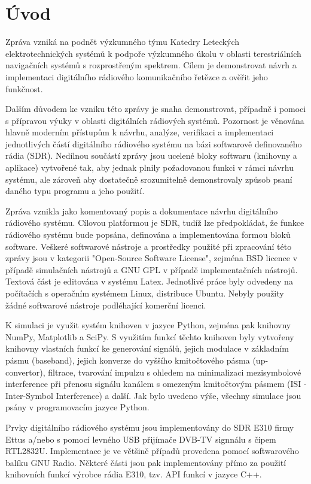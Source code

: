 \section{Úvod}


\marginpar{\textcolor{txt_blue}{Hlavní cíl zprávy}} 
Zpráva vzniká na podnět výzkumného týmu Katedry Leteckých elektrotechnických systémů k podpoře výzkumného úkolu v oblasti terestriálních navigačních systémů s rozprostřeným spektrem. Cílem je demonstrovat návrh a implementaci digitálního rádiového komunikačního řetězce a ověřit jeho funkčnost.

\marginpar{\textcolor{txt_blue}{Sekundární cíl zprávy}} 
Dalším důvodem ke vzniku této zprávy je snaha demonstrovat, případně i pomoci s přípravou výuky v oblasti digitálních rádiových systémů. Pozornost je věnována hlavně moderním přístupům k návrhu, analýze, verifikaci a implementaci jednotlivých částí digitálního rádiového systému na bázi softwarově definovaného rádia (SDR). Nedílnou součástí zprávy jsou ucelené bloky softwaru (knihovny a aplikace) vytvořené tak, aby jednak plnily požadovanou funkci v rámci návrhu systému, ale zároveň aby dostatečně srozumitelně demonstrovaly způsob psaní daného typu programu a jeho použití. 

\marginpar{\textcolor{txt_blue}{Použité prostředky}} 
Zpráva vznikla jako komentovaný popis a dokumentace návrhu digitálního rádiového systému. Cílovou platformou je SDR, tudíž lze předpokládat, že funkce rádiového systému bude popsána, definována a implementována formou bloků software. Veškeré softwarové nástroje a prostředky použité při zpracování této zprávy jsou v kategorii "Open-Source Software License", zejména BSD licence v případě simulačních nástrojů a GNU GPL v případě implementačních nástrojů. Textová část je editována v systému Latex. Jednotlivé práce byly odvedeny na počítačích s operačním systémem Linux, distribuce Ubuntu. Nebyly použity žádné softwarové nástroje podléhající komerční licenci.

K simulaci je využit systém knihoven v jazyce Python, zejména pak knihovny NumPy, Matplotlib a SciPy. S využitím funkcí těchto knihoven byly vytvořeny knihovny vlastních funkcí ke generování signálů, jejich modulace v základním pásmu (baseband), jejich konverze do vyššího kmitočtového pásma (up-convertor), filtrace, tvarování impulzu s ohledem na minimalizaci mezisymbolové interference při přenosu signálu kanálem s omezeným kmitočtovým pásmem (ISI - Inter-Symbol Interference) a další. Jak bylo uvedeno výše, všechny simulace jsou psány v programovacím jazyce Python.

Prvky digitálního rádiového systému jsou implementovány do SDR E310 firmy Ettus a/nebo s pomocí levného USB přijímače DVB-TV signnálu s čipem RTL2832U. Implementace je ve většině případů provedena pomocí softwarového balíku GNU Radio. Některé části jsou pak implementovány přímo za použití knihovních funkcí výrobce rádia E310, tzv. API funkcí v jazyce C++.

%
